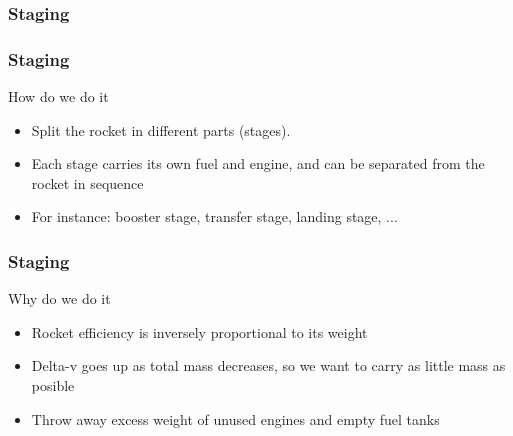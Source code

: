 {
%
\begin{frame}
    \frametitle{Staging}
\end{frame}
\begin{frame}
    \frametitle{Staging}
    \begin{block}{How do we do it}
        \begin{itemize}
            \item Split the rocket in different parts (stages).
            \item Each stage carries its own fuel and engine, and can be separated from the rocket in sequence
            \item For instance: booster stage, transfer stage, landing stage, ...
        \end{itemize}
    \end{block}
\end{frame}
\begin{frame}
    \frametitle{Staging}
    \begin{block}{Why do we do it}
        \begin{itemize}
            \item Rocket efficiency is inversely proportional to its weight
            \item Delta-v goes up as total mass decreases, so we want to carry as little mass as posible
            \item Throw away excess weight of unused engines and empty fuel tanks
        \end{itemize}
    \end{block}
\end{frame}
}
